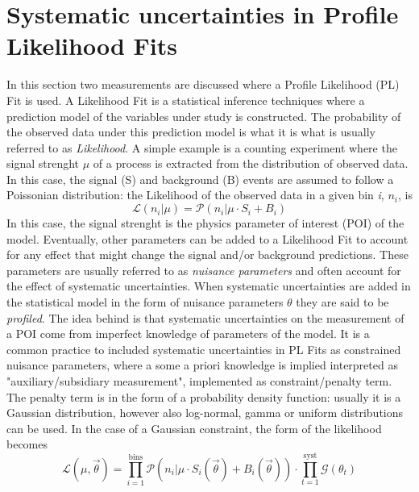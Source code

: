 \documentclass[12pt]{article}
\begin{document}
\section{Systematic uncertainties in Profile Likelihood Fits}
In this section two measurements are discussed where a Profile Likelihood (PL) Fit is used.
A Likelihood Fit is a statistical inference techniques where a prediction model of the variables under study is constructed. The probability of the observed data under this prediction model is what it is what is usually referred to as \emph{Likelihood}.
A simple example is a counting experiment where the signal strenght $\mu$ of a process is extracted from the distribution of observed data. In this case, the signal (S) and background (B) events are assumed to follow a Poissonian distribution: the Likelihood of the observed data in a given bin \emph{i}, $n_i$, is
\begin{equation}
\mathcal{L}(n_i|\mu) = \mathcal{P}(n_i|\mu\cdot S_i+B_i)
\end{equation}
In this case, the signal strenght is the physics parameter of interest (POI) of the model. Eventually, other parameters can be added to a Likelihood Fit to account for any effect that might change the signal and/or background predictions. 
These parameters are usually referred to as \emph{nuisance parameters} and often account for the effect of systematic uncertainties. When systematic uncertainties are added in the statistical model in the form of nuisance parameters $\theta$ they are said to be \emph{profiled}. The idea behind is that systematic uncertainties on the measurement of a POI come from imperfect knowledge of parameters of the model. It is a common practice to included systematic uncertainties in PL Fits as constrained nuisance parameters, where a some a priori knowledge is implied interpreted as "auxiliary/subsidiary measurement", implemented as constraint/penalty term. The penalty term is in the form of a probability density function: usually it is a Gaussian distribution, however also log-normal, gamma or uniform distributions can be used. 
In the case of a Gaussian constraint, the form of the likelihood becomes 
\begin{equation}
\mathcal{L}(\mu,\vec{\theta}) = \displaystyle\prod_{i=1}^{\mathrm{bins}}\mathcal{P}(n_i|\mu\cdot S_i(\vec{\theta})+B_i(\vec{\theta}))\cdot\displaystyle\prod_{t=1}^{\mathrm{syst}}\mathcal{G}(\theta_t)
\end{equation}
\end{document}
